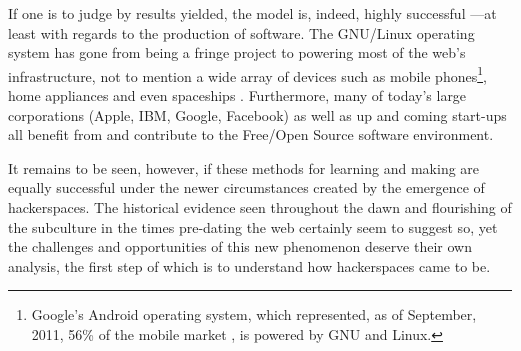 If one is to judge by results yielded, the model is, indeed, highly successful ---at least with regards to the production of software. The GNU/Li\-nux operating system has gone from being a fringe project to powering most of the web's infrastructure, not to mention a wide array of devices such as mobile phones\footnote{Google's Android operating system, which represented, as of September, 2011, 56\% of the mobile market \citep{jackson12}, is powered by GNU and Linux.}, home appliances and even spaceships \citep{debian97}. Furthermore, many of today's large corporations (Apple, IBM, Google, Facebook) as well as up and coming start-ups all benefit from and contribute to the Free/Open Source software environment.

It remains to be seen, however, if these methods for learning and making are equally successful under the newer circumstances created by the emergence of hackerspaces. The historical evidence seen throughout the dawn and flourishing of the subculture in the times pre-dating the web certainly seem to suggest so, yet the challenges and opportunities of this new phenomenon deserve their own analysis, the first step of which is to understand how hackerspaces came to be.














